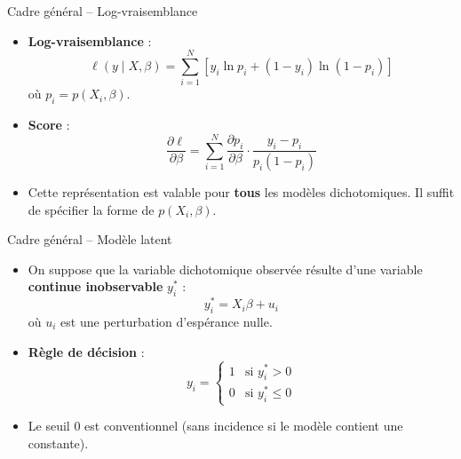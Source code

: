 \documentclass[11pt,aspectratio=169]{beamer}
\begin{document}
\begin{frame}{Cadre général -- Log-vraisemblance}

\begin{itemize}

\item \textbf{Log-vraisemblance} :
  \[
  \ell(y \mid X, \beta) = \sum_{i=1}^{N} \left[ y_i \ln p_i + (1-y_i) \ln(1-p_i) \right]
  \]
  où $p_i = p(X_i, \beta)$.\newline

\item \textbf{Score} :
  \[
  \frac{\partial \ell}{\partial \beta} = \sum_{i=1}^{N} \frac{\partial p_i}{\partial \beta} \cdot \frac{y_i - p_i}{p_i(1-p_i)}
  \]

\item Cette représentation est valable pour \textbf{tous} les modèles
  dichotomiques. Il suffit de spécifier la forme de $p(X_i, \beta)$.

\end{itemize}

\end{frame}

\begin{frame}{Cadre général -- Modèle latent}

\begin{itemize}

\item On suppose que la variable dichotomique observée résulte d'une variable
  \textbf{continue inobservable} $y_i^*$ :
  \[
  y_i^* = X_i \beta + u_i
  \]
  où $u_i$ est une perturbation d'espérance nulle.\newline

\item \textbf{Règle de décision} :
  \[
  y_i = \begin{cases}
      1 & \text{si } y_i^* > 0 \\
      0 & \text{si } y_i^* \leq 0
  \end{cases}
  \]

\item Le seuil 0 est conventionnel (sans incidence si le modèle contient une
  constante).

\end{itemize}

\end{frame}
\end{document}
